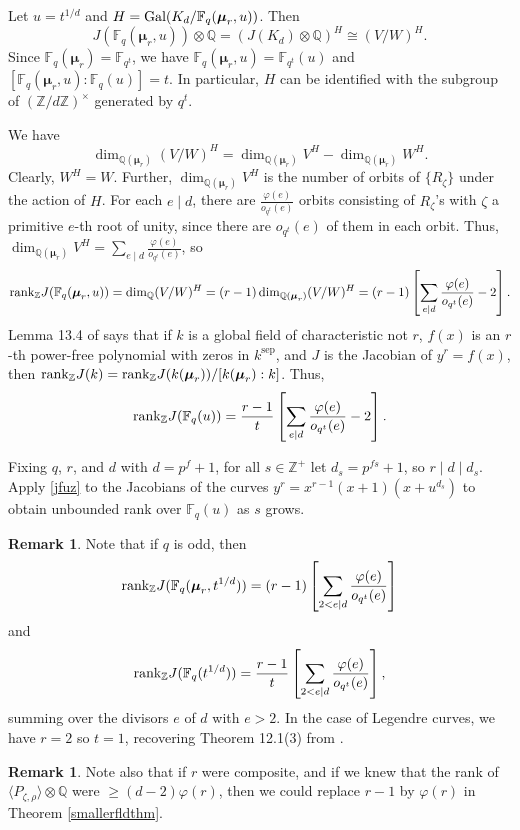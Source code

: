 \documentclass[reqno]{amsart}
\theoremstyle{definition}
\newtheorem{rem}[thm]{Remark}
\theoremstyle{remark}
\newcommand{\sep}{\operatorname{sep}}
\def\bmu{{\boldsymbol\mu}}
\def\Gal{\textrm{\upshape Gal}}
\def\Q{\mathbb{Q}}
\def\Z{\mathbb{Z}}
\def\F{\mathbb{F}}
\def\rank{\textnormal{rank}}
\begin{document}
Let $u=t^{1/d}$ and $H = \Gal(K_d/\F_q(\bmu_r,u))$.
Then
$$
J(\F_q(\bmu_r,u)) \otimes \Q =  (J(K_d) \otimes \Q)^H \cong (V/W)^H.
$$
Since $\F_q(\bmu_r) = \F_{q^t}$, we have $\F_q(\bmu_r,u) = \F_{q^t}(u)$
and $[\F_q(\bmu_r,u): \F_{q}(u)]=t$.
In particular, $H$ can be identified with the subgroup of $(\Z/d\Z)^\times$
generated by $q^t$.

We have
$$
\dim_{\Q(\bmu_r)} (V/W)^H = \dim_{\Q(\bmu_r)} V^H - \dim_{\Q(\bmu_r)} W^H.
$$
Clearly, $W^H = W$.
Further, $\dim_{\Q(\bmu_r)} V^H$ is the number of orbits of
$\{ R_\zeta \}$ under the action of $H$.
For each $e\mid d$, there are $\frac{\varphi(e)}{o_{q^t}(e)}$
orbits consisting of $R_\zeta$'s with $\zeta$ a primitive $e$-th
root of unity, since there are $o_{q^t}(e)$ of them in each orbit.
Thus, 
$\dim_{\Q(\bmu_r)} V^H = \sum_{e\mid d}\frac{\varphi(e)}{o_{q^t}(e)}$,
so
$$
\rank_\Z J(\F_q(\bmu_r,u)) = \dim_{\Q} (V/W)^H
= (r-1)\dim_{\Q(\bmu_r)} (V/W)^H
= (r-1)\left[\sum_{e\mid d}\frac{\varphi(e)}{o_{q^t}(e)}- 2 \right].
$$
Lemma 13.4 of \cite{ps} says that if $k$ is a global field of characteristic
not $r$, $f(x)$ is an $r$-th power-free polynomial with zeros in $k^{\sep}$,
and $J$ is the Jacobian of $y^r=f(x)$, then
$\rank_\Z J(k) = \rank_\Z J(k(\bmu_r))/[k(\bmu_r): k]$.
Thus,
\begin{equation}
\label{jfuz}
\rank_\Z J(\F_q(u)) = {\frac{r-1}{t}}\left[\sum_{e\mid d}\frac{\varphi(e)}{o_{q^t}(e)}-
2 \right].
\end{equation}


Fixing $q$, $r$, and $d$ with $d=p^f+1$, for all $s\in\Z^+$
let $d_s = p^{fs}+1$, so $r\mid d\mid d_s$.
Apply \eqref{jfuz} to 
the Jacobians of the curves $y^r=x^{r-1}(x+1)(x+u^{d_s})$ to obtain
unbounded rank over $\F_q(u)$ as $s$ grows.

\begin{rem}
Note that if $q$ is odd, then 
$$\rank_\Z J(\F_q(\bmu_r,t^{1/d})) = (r-1)\left[\sum_{2<e\mid d}\frac{\varphi(e)}{o_{q^t}(e)} \right]
$$
and
$$
\rank_\Z J(\F_q(t^{1/d})) = {\frac{r-1}{t}}\left[\sum_{2<e\mid d}\frac{\varphi(e)}{o_{q^t}(e)} \right],
$$
summing over the divisors $e$ of $d$ with $e>2$.
In the case of Legendre curves, we have $r=2$ so $t=1$, recovering 
Theorem 12.1(3) from \cite{Legendre}.
\end{rem}


\begin{rem}
Note also that if $r$ were composite, and if we knew that
the rank of $\langle P_{\zeta,\rho} \rangle \otimes \Q$ were 
$\ge (d-2)\varphi(r)$,
then we could replace $r-1$ by $\varphi(r)$ in Theorem \ref{smallerfldthm}.
\end{rem}
\end{document}
